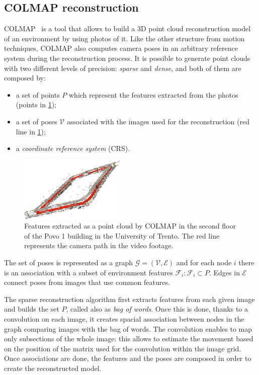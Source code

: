 \subsection{COLMAP reconstruction}
COLMAP~\cite{colmap} is a tool that allows to build a 3D point cloud reconstruction model of an environment by using photos of it.
Like the other structure from motion techniques, COLMAP also computes camera poses in an arbitrary reference system during the reconstruction process.
It is possible to generate point clouds with two different levels of precision: \emph{sparse} and \emph{dense}, and both of them are composed by:
\begin{itemize}
    \item a set of points $P$ which represent the features extracted from the photos (points in \cref{fig:features-colmap});
    \item a set of poses $\mathcal{V}$ associated with the images used for the reconstruction (red line in \cref{fig:features-colmap});
    \item a \emph{coordinate reference system} (CRS).
\end{itemize}

\begin{figure}[htbp]
    \begin{center}
        \includegraphics[width=0.45\textwidth]{./imgs/extracted_features_colmap.png}
    \end{center}
    \caption{Features extracted as a point cloud by COLMAP in the second floor of the Povo 1 building in the University of Trento. The red line represents the camera path in the video footage.}
    \label{fig:features-colmap}
\end{figure}

The set of poses is represented as a graph $\mathcal{G}=(\mathcal{V}, \mathcal{E})$ and for each node $i$ there is an association with a subset of environment features $\mathcal{F}_i : \mathcal{F}_i\subset P$. Edges in $\mathcal{E}$ connect poses from images that use common features.

The sparse reconstruction algorithm first extracts features from each given image and builds the set $P$, called also as \emph{bag of words}. Once this is done, thanks to a convolution on each image, it creates spacial association between nodes in the graph comparing images with the bag of words. The convolution enables to map only subsections of the whole image: this allows to estimate the movement based on the position of the matrix used for the convolution within the image grid. Once associations are done, the features and the poses are composed in order to create the reconstructed model.

